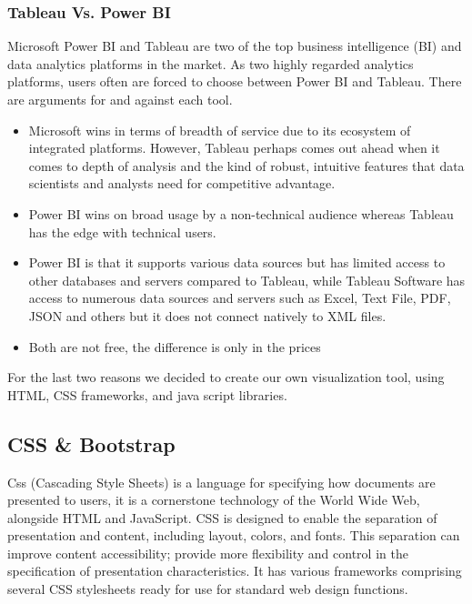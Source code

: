 \subsubsection{Tableau Vs. Power BI}
Microsoft Power BI and Tableau are two of the top business intelligence (BI) and data analytics platforms in the market. As two highly regarded analytics platforms, users often are forced to choose between Power BI and Tableau. There are arguments for and against each tool\cite{robbPowerBIVs2022}.
\begin{itemize}
    \renewcommand{\labelitemi}{$\bullet$}
    \item Microsoft wins in terms of breadth of service due to its ecosystem of integrated platforms. However, Tableau perhaps comes out ahead when it comes to depth of analysis and the kind of robust, intuitive features that data scientists and analysts need for competitive advantage.
    \item Power BI wins on broad usage by a non-technical audience whereas Tableau has the edge with technical users.
    \item Power BI is that it supports various data sources but has limited access to other databases and servers compared to Tableau, while Tableau Software has access to numerous data sources and servers such as Excel, Text File, PDF, JSON and others but it does not connect natively to XML files.
    \item Both are not free, the difference is only in the prices
\end{itemize}
\bigbreak
For the last two reasons we decided to create our own visualization tool, using HTML, CSS frameworks, and java script libraries.
\newpage
\subsection{CSS \& Bootstrap}
Css (Cascading Style Sheets) is a language for specifying how documents are presented to users\cite{WhatCSSLearn}, it is a cornerstone technology of the World Wide Web, alongside HTML and JavaScript. CSS is designed to enable the separation of presentation and content, including layout, colors, and fonts. This separation can improve content accessibility; provide more flexibility and control in the specification of presentation characteristics\cite{CSS2022}. It has various frameworks comprising several CSS stylesheets ready for use  for standard web design functions.

